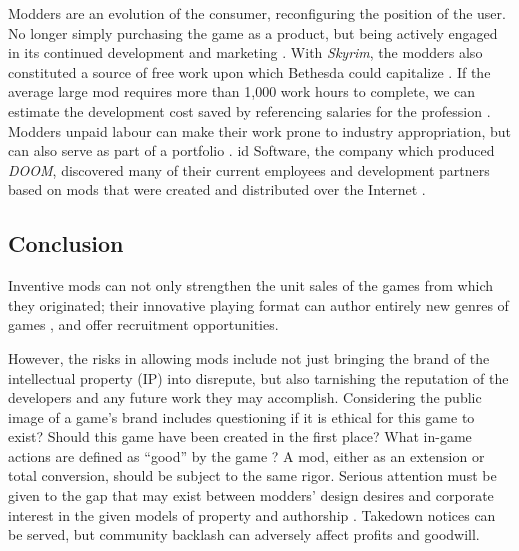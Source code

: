 \documentclass{scrartcl}
\begin{document}
Modders are an evolution of the consumer, reconfiguring the position of the user. No longer simply purchasing the game as a product, but being actively engaged in its continued development and marketing \cite{herman2006your}. With \textit{Skyrim}, the modders also constituted a source of free work upon which Bethesda could capitalize \cite{hong2013game}. If the average large mod requires more than 1,000 work hours to complete, we can estimate the development cost saved by referencing salaries for the profession \cite{postigo2007mods}. Modders unpaid labour can make their work prone to industry appropriation, but can also serve as part of a portfolio \cite{nieborg2008mod}. id Software, the company which produced \textit{DOOM}, discovered many of their current employees and development partners based on mods that were created and distributed over the Internet \cite{hong2014becoming}. 

\subsection*{Conclusion}

Inventive mods can not only strengthen the unit sales of the games from which they originated; their innovative playing format can author entirely new genres of games \cite{hong2014becoming}, and offer recruitment opportunities.

However, the risks in allowing mods include not just bringing the brand of the intellectual property (IP) into disrepute, but also tarnishing the reputation of the developers and any future work they may accomplish. Considering the public image of a game's brand includes questioning if it is ethical for this game to exist? Should this game have been created in the first place? What in-game actions are defined as ``good'' by the game \cite{zagal2009ethically}? A mod, either as an extension or total conversion, should be subject to the same rigor. Serious attention must be given to the gap that may exist between modders' design desires and corporate interest in the given models of property and authorship \cite{taylor2002whose}. Takedown notices can be served, but community backlash can adversely affect profits and goodwill.



\end{document}
